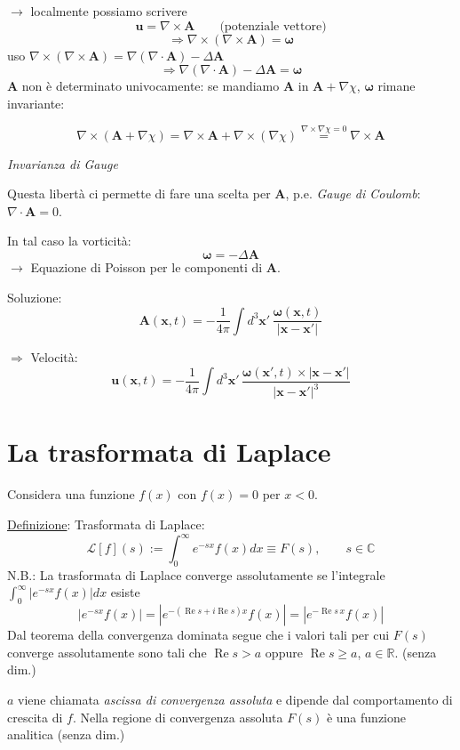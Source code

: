\documentclass[a4paper,11pt]{report}
\newcommand{\vect}[1]{\boldsymbol{#1}}
\newcommand{\R}{\mathbb{R}}
\newcommand{\x}{\boldsymbol{x}}
\begin{document}
$\rightarrow$ localmente possiamo scrivere
\[
\vect{u}=\nabla \times \vect{A} \qquad\text{(potenziale vettore)}
\]
\[
\Rightarrow \nabla \times (\nabla \times \vect{A})=\vect{\omega}
\]
uso $\nabla\times(\nabla\times \vect{A})=\nabla(\nabla\cdot \vect{A}) - \Delta \vect{A}$
\[
\Rightarrow \nabla(\nabla\cdot \vect{A}) - \Delta \vect{A}=\vect{\omega}
\]
$\vect{A}$ non \`e determinato univocamente: se mandiamo $\vect{A}$ in $\vect{A}+\nabla\chi$, $\vect{\omega}$ rimane invariante:
\begin{samepage}
\[
\nabla\times(\vect{A}+\nabla\chi)=\nabla\times\vect{A}+\nabla\times(\nabla\chi)\overset{\nabla\times\nabla\chi=0}{=}\nabla\times\vect{A}
\]
\centerline{\emph{Invarianza di Gauge}}
\end{samepage}

Questa libert\`a ci permette di fare una scelta per $\vect{A}$, p.e. \emph{Gauge di Coulomb}: $\nabla\cdot\vect{A}=0$.

In tal caso la vorticit\`a:
\[
\vect{\omega}=-\Delta \vect{A}
\]
$\rightarrow$ Equazione di Poisson per le componenti di $\vect{A}$.

Soluzione: 
\[
\vect{A}(\x,t)=-\frac{1}{4 \pi}\int d^3\x'\,\frac{\vect{\omega}(\x,t)}{|\x-\x'|}
\]

$\Rightarrow$ Velocit\`a:
\[
\vect{u}(\x,t)=-\frac{1}{4 \pi}\int d^3\x'\,\frac{\vect{\omega}(\x',t)\times|\x-\x'|}{|\x-\x'|^3}
\]

\section{La trasformata di Laplace}

Considera una funzione $f(x)$ con $f(x)=0$ per $x<0$.

\underline{Definizione}: Trasformata di Laplace:
\[
\mathcal{L}[f](s):=\int_0^{\infty} e^{-sx} f(x)dx\equiv F(s), \qquad s \in \mathbb{C}
\]
N.B.: La trasformata di Laplace converge assolutamente se l'integrale $\int_0^{\infty} |e^{-sx} f(x)| dx$ esiste
\[
|e^{-sx} f(x)| = |e^{-(\operatorname{Re} s+ i \operatorname{Re} s )x} f(x)| =  |e^{-\operatorname{Re}s\, x} f(x)|
\]
Dal teorema della convergenza dominata segue che i valori tali per cui $F(s)$ converge assolutamente sono tali che $\operatorname{Re}s > a$ oppure $\operatorname{Re}s \geq a$, $a\in\R$. (senza dim.)

\smallskip

$a$ viene chiamata \emph{ascissa di convergenza assoluta} e dipende dal comportamento di crescita di $f$. Nella regione di convergenza assoluta $F(s)$ \`e una funzione analitica (senza dim.)
\end{document}
